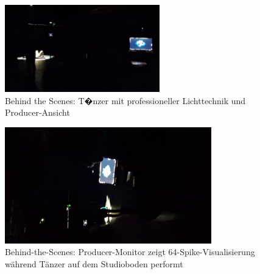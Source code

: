 \begin{figure}[!htbp]
   \centering
   \includegraphics[width=0.6\textwidth,height=0.25\textheight,keepaspectratio]{images/BTS_TopDown_DancerAndProducer.png}
   \caption{Behind the Scenes: T�nzer mit professioneller Lichttechnik und Producer-Ansicht}
   \label{fig:studio_wide}
\end{figure}



\begin{figure}[htbp]
    \centering
    \includegraphics[width=0.8\textwidth,height=0.4\textheight,keepaspectratio]{images/BehindTheScenesDuringShotTopDownProducerScreenVisibleAsWellAsDancerOnFloor.png}
    \caption{Behind-the-Scenes: Producer-Monitor zeigt 64-Spike-Visualisierung während Tänzer auf dem Studioboden performt}
    \label{fig:bts_topdown_produktion}
\end{figure}

